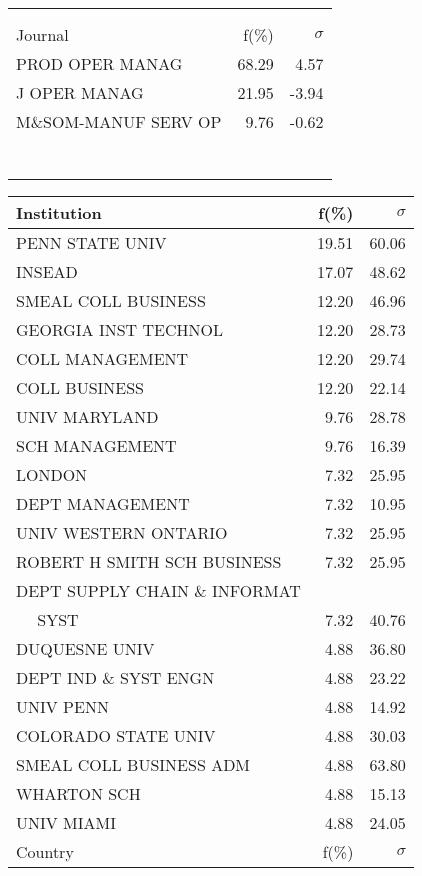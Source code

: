 \documentclass[a4paper,11pt]{report}
\begin{document}
\begin{landscape}
\begin{table}[!ht]
{\begin{tabular}{|l r r|}
 &  & \\
 &  & \\
\hline
\hline
Journal & f(\%) & $\sigma$\\
\hline
PROD OPER MANAG & 68.29 & 4.57\\
J OPER MANAG & 21.95 & -3.94\\
M\&SOM-MANUF SERV OP & 9.76 & -0.62\\
 &  & \\
 &  & \\
 &  & \\
 &  & \\
 &  & \\
 &  & \\
 &  & \\
\hline
\end{tabular}
}
{\scriptsize\begin{tabular}{|l r r|}
\hline
Institution & f(\%) & $\sigma$\\
\hline
PENN STATE UNIV & 19.51 & 60.06\\
INSEAD & 17.07 & 48.62\\
SMEAL COLL BUSINESS & 12.20 & 46.96\\
GEORGIA INST TECHNOL & 12.20 & 28.73\\
COLL MANAGEMENT & 12.20 & 29.74\\
COLL BUSINESS & 12.20 & 22.14\\
UNIV MARYLAND & 9.76 & 28.78\\
SCH MANAGEMENT & 9.76 & 16.39\\
LONDON & 7.32 & 25.95\\
DEPT MANAGEMENT & 7.32 & 10.95\\
UNIV WESTERN ONTARIO & 7.32 & 25.95\\
ROBERT H SMITH SCH BUSINESS & 7.32 & 25.95\\
DEPT SUPPLY CHAIN \& INFORMAT &  & \\
$\quad$ SYST & 7.32 & 40.76\\
DUQUESNE UNIV & 4.88 & 36.80\\
DEPT IND \& SYST ENGN & 4.88 & 23.22\\
UNIV PENN & 4.88 & 14.92\\
COLORADO STATE UNIV & 4.88 & 30.03\\
SMEAL COLL BUSINESS ADM & 4.88 & 63.80\\
WHARTON SCH & 4.88 & 15.13\\
UNIV MIAMI & 4.88 & 24.05\\
\hline
\hline
Country & f(\%) & $\sigma$\\

\end{tabular}}
\end{table}
\end{landscape}
\end{document}
